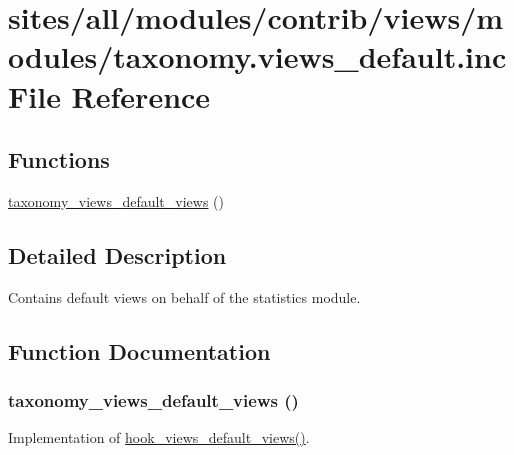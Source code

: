 \hypertarget{taxonomy_8views__default_8inc}{
\section{sites/all/modules/contrib/views/modules/taxonomy.views\_\-default.inc File Reference}
\label{taxonomy_8views__default_8inc}
}
\subsection*{Functions}
\begin{CompactItemize}
\item 
\hyperlink{taxonomy_8views__default_8inc_dd840bcb14060e4e184f0f4d6d2b4622}{taxonomy\_\-views\_\-default\_\-views} ()
\end{CompactItemize}


\subsection{Detailed Description}
Contains default views on behalf of the statistics module. 

\subsection{Function Documentation}
\hypertarget{taxonomy_8views__default_8inc_dd840bcb14060e4e184f0f4d6d2b4622}{
\subsubsection[{taxonomy\_\-views\_\-default\_\-views}]{\setlength{\rightskip}{0pt plus 5cm}taxonomy\_\-views\_\-default\_\-views ()}}
\label{taxonomy_8views__default_8inc_dd840bcb14060e4e184f0f4d6d2b4622}


Implementation of \hyperlink{group__views__hooks_g23edb74860682fa88f75cf94b97c2e15}{hook\_\-views\_\-default\_\-views()}. 